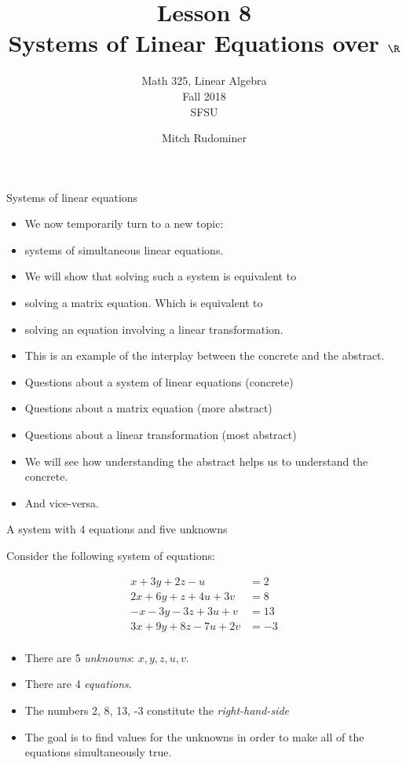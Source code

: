 \documentclass{beamer}
\title{Lesson 8 \\ Systems of Linear Equations over $\R$}
\subtitle{Math 325, Linear Algebra \\ Fall 2018 \\ SFSU}
\author{Mitch Rudominer}
\date{}
\begin{document}
\begin{frame}
  \titlepage
\end{frame}

\begin{frame}{Systems of linear equations}

\begin{itemize}
\item We now temporarily turn to a new topic:
\item systems of simultaneous linear equations.
\item We will show that solving such a system is equivalent to
\item solving a matrix equation. Which is equivalent to
\item solving an equation involving a linear transformation.
\item This is an example of the interplay between the concrete and the abstract.
\item Questions about a system of linear equations (concrete)
\item Questions about a matrix equation (more abstract)
\item Questions about a linear transformation (most abstract)
\item We will see how understanding the abstract helps us to understand the
concrete.
\item And vice-versa.
\end{itemize}
\end{frame}

\begin{frame}{A system with 4 equations and five unknowns}

Consider the following system of equations:

\begin{align*}
 x + 3y + 2z - u  \qquad &= 2 \\
2x + 6y + z + 4u + 3v  &= 8 \\
-x -3y  -3z + 3u + v  &= 13 \\
3x + 9y + 8z  -7u + 2v  &= -3 \\
\end{align*}

\begin{itemize}
\item There are 5 \emph{unknowns}: $x, y, z, u, v$.
\item There are 4 \emph{equations}.
\item The numbers 2, 8, 13, -3 constitute the \emph{right-hand-side}
\item The goal is to find values for the unknowns in order to make all of the
equations simultaneously true.
\end{itemize}

\end{frame}
\end{document}
